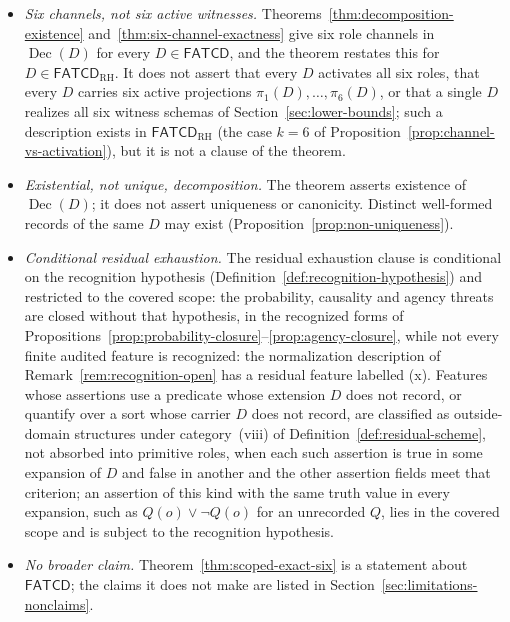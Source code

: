 \documentclass[11pt]{article}
\theoremstyle{definition}
\newcommand{\FATCD}{\ensuremath{\mathsf{FATCD}}}
\newcommand{\Dec}[1]{\ensuremath{\operatorname{Dec}\!\left(#1\right)}}
\begin{document}
\begin{itemize}[topsep=2pt,itemsep=1pt]
  \item \emph{Six channels, not six active witnesses.}
    Theorems~\ref{thm:decomposition-existence}
    and~\ref{thm:six-channel-exactness} give six role channels in \(\Dec{D}\)
    for every \(D \in \FATCD{}\), and the theorem restates this for
    \(D\in\FATCD_{\mathrm{RH}}\). It does not assert that every \(D\) activates
    all six roles, that every \(D\) carries six active projections
    \(\pi_1(D), \ldots, \pi_6(D)\), or that a single \(D\) realizes
    all six witness schemas of Section~\ref{sec:lower-bounds}; such a
    description exists in \(\FATCD_{\mathrm{RH}}\) (the case \(k=6\) of
    Proposition~\ref{prop:channel-vs-activation}), but it is not a clause of
    the theorem.
  \item \emph{Existential, not unique, decomposition.} The theorem
    asserts existence of \(\Dec{D}\); it does not assert uniqueness or
    canonicity. Distinct well-formed records of the same \(D\) may
    exist (Proposition~\ref{prop:non-uniqueness}).
  \item \emph{Conditional residual exhaustion.} The residual
    exhaustion clause is conditional on the recognition hypothesis
    (Definition~\ref{def:recognition-hypothesis}) and restricted to the
    covered scope: the probability, causality and agency threats are
    closed without that hypothesis, in the recognized forms of
    Propositions~\ref{prop:probability-closure}--\ref{prop:agency-closure},
    while not every finite audited feature is recognized: the
    normalization description of Remark~\ref{rem:recognition-open} has a
    residual feature labelled (x). Features whose assertions use a predicate whose extension \(D\) does not record, or quantify over a sort whose carrier \(D\) does not record, are classified as outside-domain structures under category~(viii) of Definition~\ref{def:residual-scheme}, not absorbed into primitive roles, when each such assertion is true in some expansion of \(D\) and false in another and the other assertion fields meet that criterion; an assertion of this kind with the same truth value in every expansion, such as \(Q(o)\vee\neg Q(o)\) for an unrecorded \(Q\), lies in the covered scope and is subject to the recognition hypothesis.
  \item \emph{No broader claim.} Theorem~\ref{thm:scoped-exact-six}
    is a statement about \FATCD{}; the claims it does not make are
    listed in Section~\ref{sec:limitations-nonclaims}.
\end{itemize}
\end{document}
